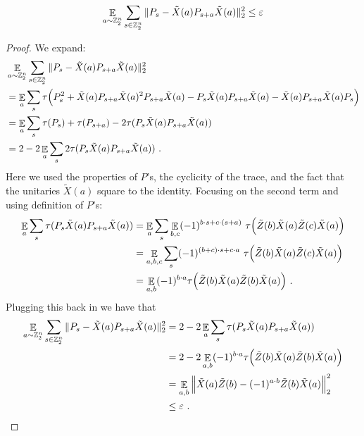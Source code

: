 \begin{lemma}
    \[
    \mathop{\mathbb{E}}\displaylimits_{a \sim \mathbb{Z}_2^n} \sum_{s \in \mathbb{Z}_2^n} \| P_s - \tilde{X}(a) P_{s+a} \tilde{X}(a) \|_2^2 \leq \varepsilon
    \]
\end{lemma}
\begin{proof}
We expand:
    \begin{align*}
        &\mathop{\mathbb{E}}\displaylimits_{a \sim \mathbb{Z}_2^n} \sum_{s \in \mathbb{Z}_2^n} \| P_s - \tilde{X}(a) P_{s+a} \tilde{X}(a) \|_2^2 \\
        &= \mathop{\mathbb{E}}\displaylimits_a \sum_s \tau \Big (P_s^2 + \tilde{X}(a) P_{s+a} \tilde{X}(a)^2 P_{s+a} \tilde{X}(a) -  P_s \tilde{X}(a) P_{s+a} \tilde{X}(a) -  \tilde{X}(a) P_{s+a} \tilde{X}(a) P_s \Big) \\
        &= \mathop{\mathbb{E}}\displaylimits_a \sum_s \tau(P_s) + \tau(P_{s+a}) - 2\tau(P_s \tilde{X}(a) P_{s+a} \tilde{X}(a) ) \\
        &= 2 - 2\mathop{\mathbb{E}}\displaylimits_a \sum_s 2\tau(P_s \tilde{X}(a) P_{s+a} \tilde{X}(a) )~.
    \end{align*}
    Here we used the properties of $P$'s, the cyclicity of the trace, and the fact that the unitaries $\tilde{X}(a)$ square to the identity. Focusing on the second term and using definition of $P$'s:
    \begin{align*}
        \mathop{\mathbb{E}}\displaylimits_a \sum_s \tau(P_s \tilde{X}(a) P_{s+a} \tilde{X}(a) ) &= \mathop{\mathbb{E}}\displaylimits_a \sum_s \mathop{\mathbb{E}}\displaylimits_{b,c} (-1)^{b \cdot s + c \cdot (s + a)} \, \, \tau \Big(\tilde{Z}(b) \tilde{X}(a) \tilde{Z}(c) \tilde{X}(a) \Big) \\
        &= \mathop{\mathbb{E}}\displaylimits_{a,b,c} \sum_s (-1)^{(b+c) \cdot s + c \cdot a} \, \, \tau \Big(\tilde{Z}(b) \tilde{X}(a) \tilde{Z}(c) \tilde{X}(a) \Big) \\
        &= \mathop{\mathbb{E}}\displaylimits_{a,b} (-1)^{b \cdot a}  \tau \Big(\tilde{Z}(b) \tilde{X}(a) \tilde{Z}(b) \tilde{X}(a) \Big)~.
    \end{align*}
    Plugging this back in we have that
    \begin{align*}
\mathop{\mathbb{E}}\displaylimits_{a \sim \mathbb{Z}_2^n} \sum_{s \in \mathbb{Z}_2^n} \| P_s - \tilde{X}(a) P_{s+a} \tilde{X}(a) \|_2^2 &= 2 - 2\mathop{\mathbb{E}}\displaylimits_a \sum_s \tau(P_s \tilde{X}(a) P_{s+a} \tilde{X}(a) ) \\
&= 2 - 2 \mathop{\mathbb{E}}\displaylimits_{a,b} (-1)^{b \cdot a}  \tau \Big(\tilde{Z}(b) \tilde{X}(a) \tilde{Z}(b) \tilde{X}(a) \Big) \\
&= \mathop{\mathbb{E}}\displaylimits_{a,b} \Big \|\tilde{X}(a) \tilde{Z}(b) - (-1)^{a \cdot b} \tilde{Z}(b) \tilde{X}(a) \Big \|_2^2  \\
&\leq \varepsilon~.
    \end{align*}
\end{proof}


